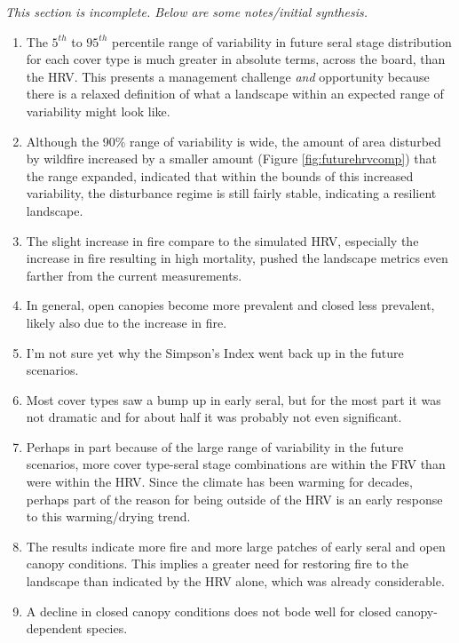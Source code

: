 \documentclass[12pt]{article}
\begin{document}
\begin{spacing}{1}
\emph{This section is incomplete. Below are some notes/initial synthesis.}
\begin{enumerate}
	\item The $5^{th}$ to $95^{th}$ percentile range of variability in future seral stage distribution for each cover type is much greater in absolute terms, across the board, than the HRV. This presents a management challenge \emph{and} opportunity because there is a relaxed definition of what a landscape within an expected range of variability might look like.
	\item Although the 90\% range of variability is wide, the amount of area disturbed by wildfire increased by a smaller amount (Figure \ref{fig:futurehrvcomp}) that the range expanded, indicated that within the bounds of this increased variability, the disturbance regime is still fairly stable, indicating a resilient landscape. 
	\item The slight increase in fire compare to the simulated HRV, especially the increase in fire resulting in high mortality, pushed the landscape metrics even farther from the current measurements.
	\item In general, open canopies become more prevalent and closed less prevalent, likely also due to the increase in fire. 
	\item I'm not sure yet why the Simpson's Index went back up in the future scenarios.
	\item Most cover types saw a bump up in early seral, but for the most part it was not dramatic and for about half it was probably not even significant.
	\item Perhaps in part because of the large range of variability in the future scenarios, more cover type-seral stage combinations are within the FRV than were within the HRV. Since the climate has been warming for decades, perhaps part of the reason for being outside of the HRV is an early response to this warming/drying trend.
	\item The results indicate more fire and more large patches of early seral and open canopy conditions. This implies a greater need for restoring fire to the landscape than indicated by the HRV alone, which was already considerable.
	\item A decline in closed canopy conditions does not bode well for closed canopy-dependent species.

\end{enumerate}


\end{spacing}
\end{document}
